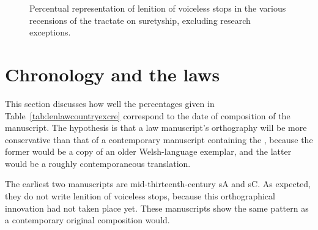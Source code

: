   \begin{figure}[h]
    \centering
    \caption{Percentual representation of lenition of voiceless stops in the various recensions of the tractate on suretyship, excluding research exceptions.}
    \label{fig:barchartlaws}
  \end{figure}

\section{Chronology and the laws}
\label{sec:chronology-laws}

This section discusses how well the percentages given in Table~\ref{tab:lenlawcountryexcre} correspond to the date of composition of the manuscript. The hypothesis is that a law manuscript's orthography will be more conservative than that of a contemporary manuscript containing the , because the former would be a copy of an older Welsh-language exemplar, and the latter would be a roughly contemporaneous translation.

The earliest two manuscripts are mid-thirteenth-century \gls{sA} and \gls{sC}. As expected, they do not write lenition of voiceless stops, because this orthographical innovation had not taken place yet. These manuscripts show the same pattern as a contemporary original composition would.

